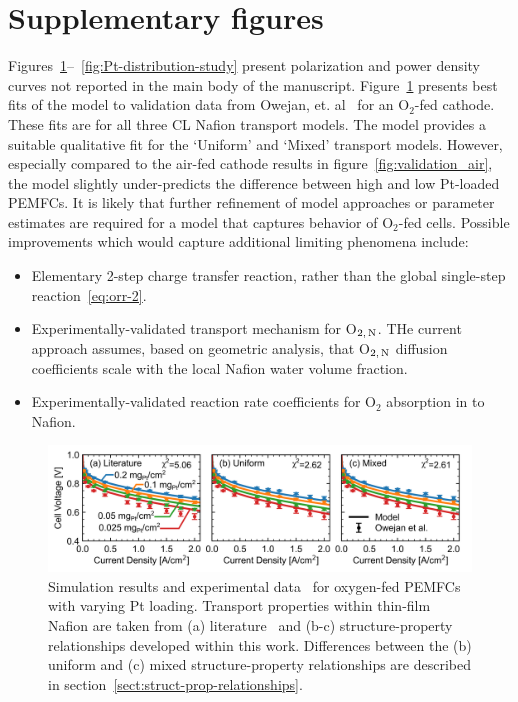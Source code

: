 \documentclass[final,3p,times,onecolumn]{elsarticle}    %
\begin{document}
\section{Supplementary figures}
Figures~\ref{fig:validation_o2}--~\ref{fig:Pt-distribution-study} present polarization and power density curves not reported in the main body of the manuscript.  Figure~\ref{fig:validation_o2} presents best fits of the model to validation data from Owejan, et. al~\cite{bib:owejan_2013} for an O$_2$-fed cathode.  These fits are for all three CL Nafion transport models.  The model provides a suitable qualitative fit for the `Uniform' and `Mixed' transport models.  However, especially compared to the air-fed cathode results in figure~\ref{fig:validation_air}, the model slightly under-predicts the difference between high and low Pt-loaded PEMFCs. It is likely that further refinement of model approaches or parameter estimates are required for a model that captures behavior of O$_2$-fed cells.  Possible improvements which would capture additional limiting phenomena include:
\begin{itemize}
    \item Elementary 2-step charge transfer reaction, rather than the global single-step reaction~\ref{eq:orr-2}.
    \item Experimentally-validated transport mechanism for O$_{\rm 2,\,N}$. THe current approach assumes, based on geometric analysis, that O$_{\rm 2,\,N}$ diffusion coefficients scale with the local Nafion water volume fraction.
    \item Experimentally-validated reaction rate coefficients for O$_2$ absorption in to Nafion.
\end{itemize}
\begin{figure}[H]
    \centering
    \includegraphics[width=6.47in]{figures/validation-o2-6_47in.png}
    \caption{Simulation results and experimental data~\cite{bib:owejan_2013} for oxygen-fed PEMFCs with varying Pt loading. Transport properties within thin-film Nafion are taken from (a) literature~\cite{bib:yadav_2012, bib:sethuraman_2009} and (b-c) structure-property relationships developed within this work. Differences between the (b) uniform and (c) mixed structure-property relationships are described in section~\ref{sect:struct-prop-relationships}.}
    \label{fig:validation_o2}
\end{figure}
\end{document}
